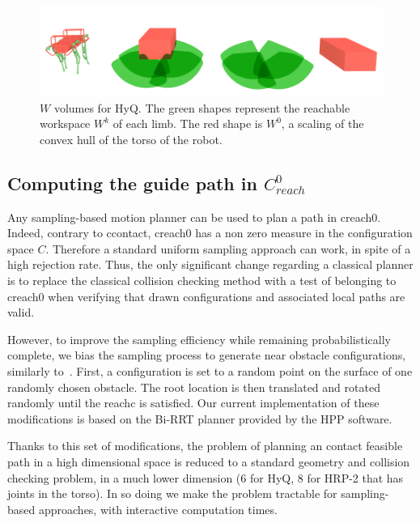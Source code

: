 \begin{figure}
  \centering
  \includegraphics[width=0.95\linewidth]{figures/HyQ_roms}
  \caption{
           $W$ volumes for HyQ. The green shapes represent the reachable workspace $W^k$ of each limb. The red shape is $W^0$, a scaling of the convex hull
           of the torso of the robot.}
		   \label{fig:HyQ_roms}
\end{figure}

\subsection{Computing the guide path in $C_{reach}^0$}
Any sampling-based motion planner can be used to plan a path in \gls{creach0}. 
Indeed, contrary to \gls{ccontact}, \gls{creach0} has a non zero measure in the configuration space $C$. Therefore a standard uniform sampling approach
can work, in spite of a high rejection rate. 
Thus, the only significant change regarding a classical planner is to replace the classical collision checking method with a test of belonging to \gls{creach0} when verifying
that drawn configurations and associated local paths are valid.

However, to improve the sampling efficiency while remaining probabilistically complete, we bias the sampling process to generate near obstacle configurations, similarly to~\cite{Amato98choosinggood}.
First, a configuration is set to a random point on the surface of one randomly chosen obstacle. The root location is then translated and rotated randomly until the \gls{reachc} is satisfied.
Our current implementation of these modifications is based on the Bi-RRT planner \citep{770022} provided by the HPP software.

Thanks to this set of modifications, the problem of planning an \gls{contact feasible} path in a high dimensional space is reduced to a standard geometry and collision checking problem, in a much lower dimension (6 for HyQ, 8 for HRP-2 that has joints in the torso). In so doing we make the problem tractable for sampling-based approaches, with \gls{interactive} computation times.
